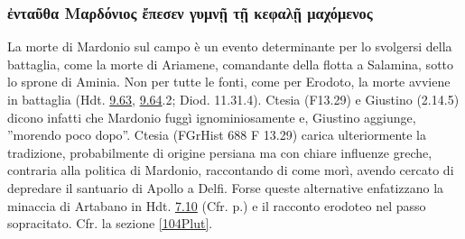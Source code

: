 {    \subsubsection{\textgreek{ἐνταῦθα Μαρδόνιος ἔπεσεν γυμνῇ τῇ κεφαλῇ μαχόμενος}}
    La morte di Mardonio sul campo è un evento determinante per lo svolgersi della battaglia, come la morte di Ariamene, comandante della flotta a Salamina, sotto lo sprone di Aminia. Non per tutte le fonti, come per Erodoto, la morte avviene in battaglia (Hdt. \href{http://data.perseus.org/citations/urn:cts:greekLit:tlg0016.tlg001.perseus-grc1:9.63}{9.63}, \href{http://data.perseus.org/citations/urn:cts:greekLit:tlg0016.tlg001.perseus-grc1:9.64}{9.64}.2; Diod. 11.31.4). Ctesia (F13.29) e  Giustino (2.14.5) dicono infatti che Mardonio fuggì ignominiosamente  e,  Giustino aggiunge, ''morendo poco dopo''. Ctesia (FGrHist 688 F 13.29) carica ulteriormente la tradizione, probabilmente di origine persiana ma con chiare influenze greche, contraria alla politica di Mardonio, raccontando di come morì, avendo cercato di depredare il santuario di Apollo a Delfi. Forse queste alternative enfatizzano la minaccia di Artabano in Hdt. \href{http://data.perseus.org/citations/urn:cts:greekLit:tlg0016.tlg001.perseus-grc1:7.10}{7.10} (Cfr. p.\pageref{ArtyVSMardoc}) e il racconto erodoteo nel passo sopracitato. Cfr. la sezione \ref{104Plut}. 
}
